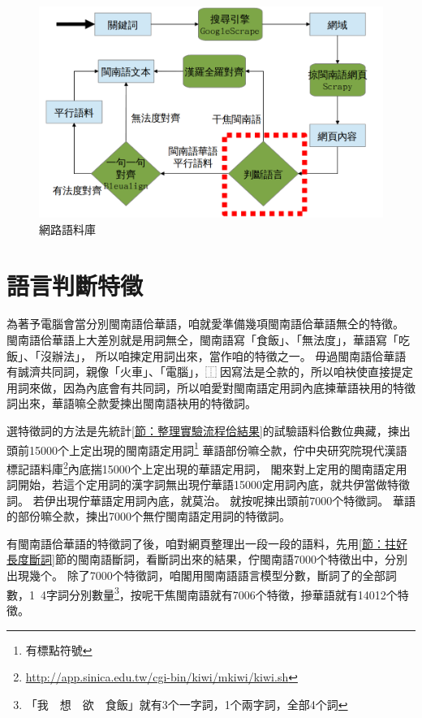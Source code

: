 \documentclass[final,oneside,onecolumn,12pt,a4paper]{book}%
\begin{document}
\begin{figure}
\centerline{\includegraphics[keepaspectratio]{圖/網路語料庫結構}}
\caption{網路語料庫}
\label{圖：網路語料庫結構}
\end{figure}



\section{語言判斷特徵}
\label{節：語言判斷特徵}
為著予電腦會當分別閩南語佮華語，咱就愛準備幾項閩南語佮華語無仝的特徵。
閩南語佮華語上大差別就是用詞無仝，閩南語寫「食飯」、「無法度」，華語寫「吃飯」、「沒辦法」，
所以咱揀定用詞出來，當作咱的特徵之一。
毋過閩南語佮華語有誠濟共同詞，親像「火車」、「電腦」，⿰因寫法是仝款的，所以咱袂使直接提定用詞來做，因為內底會有共同詞，所以咱愛對閩南語定用詞內底揀華語袂用的特徵詞出來，華語嘛仝款愛揀出閩南語袂用的特徵詞。

選特徵詞的方法是先統計\ref{節：整理實驗流程佮結果}的試驗語料佮數位典藏，揀出頭前15000个上定出現的閩南語定用詞\footnote{有標點符號}
華語部份嘛仝款，佇中央研究院現代漢語標記語料庫\footnote{\url{http://app.sinica.edu.tw/cgi-bin/kiwi/mkiwi/kiwi.sh}}內底揣15000个上定出現的華語定用詞，
閣來對上定用的閩南語定用詞開始，若這个定用詞的漢字詞無出現佇華語15000定用詞內底，就共伊當做特徵詞。
若伊出現佇華語定用詞內底，就莫治。
就按呢揀出頭前7000个特徵詞。
華語的部份嘛仝款，揀出7000个無佇閩南語定用詞的特徵詞。


有閩南語佮華語的特徵詞了後，咱對網頁整理出一段一段的語料，先用\ref{節：拄好長度斷詞}節的閩南語斷詞，看斷詞出來的結果，佇閩南語7000个特徵出中，分別出現幾个。
除了7000个特徵詞，咱閣用閩南語語言模型分數，斷詞了的全部詞數，1~4字詞分別數量\footnote{「我　想　欲　食飯」就有3个一字詞，1个兩字詞，全部4个詞}，按呢干焦閩南語就有7006个特徵，摻華語就有14012个特徵。
\end{document}
